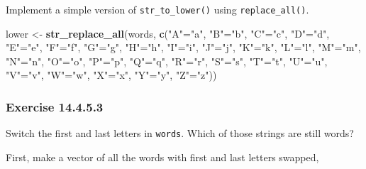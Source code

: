 \documentclass[]{book}
\newenvironment{Shaded}{\begin{snugshade}}{\end{snugshade}}
\newcommand{\KeywordTok}[1]{\textcolor[rgb]{0.13,0.29,0.53}{\textbf{#1}}}
\newcommand{\NormalTok}[1]{#1}
\newcommand{\StringTok}[1]{\textcolor[rgb]{0.31,0.60,0.02}{#1}}
\theoremstyle{plain}
\theoremstyle{remark}
\theoremstyle{definition}
\theoremstyle{definition}
\theoremstyle{definition}
\theoremstyle{remark}
\begin{document}
Implement a simple version of \texttt{str\_to\_lower()} using
\texttt{replace\_all()}.

\begin{Shaded}
\begin{Highlighting}[]
\NormalTok{lower <-}\StringTok{ }\KeywordTok{str_replace_all}\NormalTok{(words, }\KeywordTok{c}\NormalTok{(}\StringTok{"A"}\NormalTok{=}\StringTok{"a"}\NormalTok{, }\StringTok{"B"}\NormalTok{=}\StringTok{"b"}\NormalTok{, }\StringTok{"C"}\NormalTok{=}\StringTok{"c"}\NormalTok{, }\StringTok{"D"}\NormalTok{=}\StringTok{"d"}\NormalTok{, }\StringTok{"E"}\NormalTok{=}\StringTok{"e"}\NormalTok{, }\StringTok{"F"}\NormalTok{=}\StringTok{"f"}\NormalTok{, }\StringTok{"G"}\NormalTok{=}\StringTok{"g"}\NormalTok{, }\StringTok{"H"}\NormalTok{=}\StringTok{"h"}\NormalTok{, }\StringTok{"I"}\NormalTok{=}\StringTok{"i"}\NormalTok{, }\StringTok{"J"}\NormalTok{=}\StringTok{"j"}\NormalTok{, }\StringTok{"K"}\NormalTok{=}\StringTok{"k"}\NormalTok{, }\StringTok{"L"}\NormalTok{=}\StringTok{"l"}\NormalTok{, }\StringTok{"M"}\NormalTok{=}\StringTok{"m"}\NormalTok{, }\StringTok{"N"}\NormalTok{=}\StringTok{"n"}\NormalTok{, }\StringTok{"O"}\NormalTok{=}\StringTok{"o"}\NormalTok{, }\StringTok{"P"}\NormalTok{=}\StringTok{"p"}\NormalTok{, }\StringTok{"Q"}\NormalTok{=}\StringTok{"q"}\NormalTok{, }\StringTok{"R"}\NormalTok{=}\StringTok{"r"}\NormalTok{, }\StringTok{"S"}\NormalTok{=}\StringTok{"s"}\NormalTok{, }\StringTok{"T"}\NormalTok{=}\StringTok{"t"}\NormalTok{, }\StringTok{"U"}\NormalTok{=}\StringTok{"u"}\NormalTok{, }\StringTok{"V"}\NormalTok{=}\StringTok{"v"}\NormalTok{, }\StringTok{"W"}\NormalTok{=}\StringTok{"w"}\NormalTok{, }\StringTok{"X"}\NormalTok{=}\StringTok{"x"}\NormalTok{, }\StringTok{"Y"}\NormalTok{=}\StringTok{"y"}\NormalTok{, }\StringTok{"Z"}\NormalTok{=}\StringTok{"z"}\NormalTok{))}
\end{Highlighting}
\end{Shaded}

\hypertarget{exercise-14.4.5.3}{%
\subsubsection*{\texorpdfstring{Exercise
{14.4.5.3}}{Exercise 14.4.5.3}}\label{exercise-14.4.5.3}}

Switch the first and last letters in \texttt{words}. Which of those
strings are still words?

First, make a vector of all the words with first and last letters
swapped,
\end{document}
